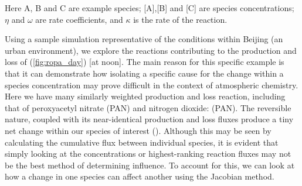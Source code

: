 Here A, B and C are example species; [A],[B] and [C] are species concentrations; $\eta$ and $\omega$ are rate coefficients, and $\kappa$ is the rate of the reaction.  

Using a sample simulation representative of the conditions within Beijing (an urban environment), we explore the reactions contributing to the production and loss of 
(\autoref{fig:ropa_day}) [at noon]. The main reason for this specific example is that it can demonstrate how isolating a specific cause for the change within a species concentration may prove difficult in the context of atmospheric chemistry. Here we have many similarly weighted production and loss reaction, including that of peroxyacetyl nitrate (PAN) and nitrogen dioxide: 
 (PAN). The reversible nature, coupled with its near-identical production and loss fluxes produce a tiny net change within our species of interest (). Although this may be seen by calculating the cumulative flux between individual species, it is evident that simply looking at the concentrations or highest-ranking reaction fluxes may not be the best method of determining influence. To account for this, we can look at how a change in one species can affect another using the Jacobian method.


